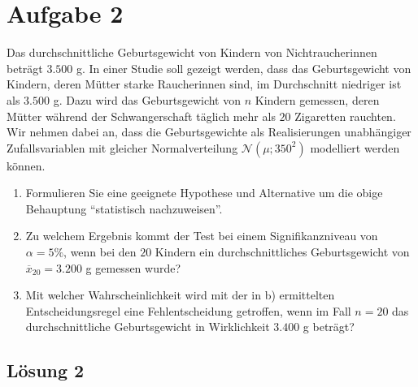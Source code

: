 \documentclass[main.tex]{subfiles}
\begin{document}
\section{Aufgabe 2}
Das durchschnittliche Geburtsgewicht von Kindern von Nichtraucherinnen beträgt $3.500$ g. In einer Studie soll gezeigt werden, dass das Geburtsgewicht von Kindern, deren Mütter starke Raucherinnen sind, im Durchschnitt niedriger ist als $3.500$ g. Dazu wird das Geburtsgewicht von $n$ Kindern gemessen, deren Mütter während der Schwangerschaft täglich mehr als $20$ Zigaretten rauchten. Wir nehmen dabei an, dass die Geburtsgewichte als Realisierungen unabhängiger Zufallsvariablen mit gleicher Normalverteilung $\mathcal{N}(\mu; 350^2)$ modelliert werden können.
\begin{enumerate}
\item Formulieren Sie eine geeignete Hypothese und Alternative um die obige Behauptung "`statistisch nachzuweisen"'.
\item Zu welchem Ergebnis kommt der Test bei einem Signifikanzniveau von $\alpha = 5\%$, wenn bei den $20$ Kindern ein durchschnittliches Geburtsgewicht von $\overline{x}_{20} = 3.200$ g gemessen wurde?
\item Mit welcher Wahrscheinlichkeit wird mit der in b) ermittelten Entscheidungsregel eine Fehlentscheidung getroffen, wenn im Fall $n = 20$ das durchschnittliche Geburtsgewicht in Wirklichkeit $3.400$ g beträgt?
\end{enumerate}

\subsection{Lösung 2}
\end{document}

